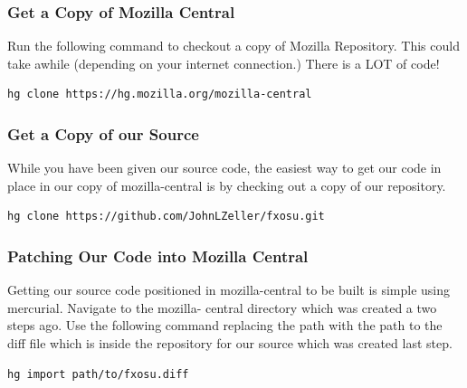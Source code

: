 \documentclass[12pt]{article}
\begin{document}
\subsubsection{Get a Copy of Mozilla Central}
	Run the following command to checkout a copy of Mozilla Repository.  This could take awhile (depending 
	on your internet connection.)  There is a LOT of code!
	
	\begin{lstlisting}[style=BashInputStyle, breaklines=true]
	hg clone https://hg.mozilla.org/mozilla-central
	\end{lstlisting}
	
\subsubsection{Get a Copy of our Source} 
	While you have been given our source code, the easiest way to get our code in place in our copy of mozilla-central is by
	checking out a copy of our repository. 

	\begin{lstlisting}[style=BashInputStyle, breaklines=true]
	hg clone https://github.com/JohnLZeller/fxosu.git
	\end{lstlisting}	
	
\subsubsection{Patching Our Code into Mozilla Central}
	Getting our source code positioned in mozilla-central to be built is simple using mercurial.  Navigate to the mozilla-
	central directory which was created a two steps ago.  Use the following command replacing the path with the path to the
	diff file which is inside the repository for our source which was created last step.
	
	\begin{lstlisting}[style=BashInputStyle]
	hg import path/to/fxosu.diff
	\end{lstlisting}
	
\end{document}
